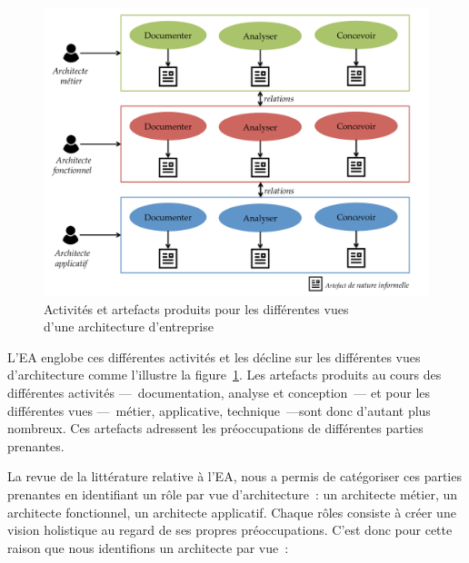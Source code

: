 \begin{figure}[!ht]
     \begin{center}
    \includegraphics[width=1\textwidth]{figures/4_demarche/pratique_courante_ea.pdf}
     \end{center}
     \caption{Activités et artefacts produits pour les différentes vues \\
              d'une architecture d'entreprise}
     \label{fig:limites_ea}
\end{figure}

L'EA englobe ces différentes activités et les décline sur les différentes
vues d'architecture comme l'illustre la
figure~\ref{fig:limites_ea}. Les artefacts produits au cours des différentes
activités —~documentation, analyse et conception~— et pour les différentes vues —~métier,
applicative, technique~—sont donc d'autant plus nombreux. Ces artefacts
adressent les préoccupations de différentes parties prenantes.

La revue de la littérature relative à l'EA, nous a permis de catégoriser ces
parties prenantes en identifiant un rôle par vue d'architecture~: un architecte
métier, un architecte fonctionnel, un architecte applicatif. Chaque
rôles consiste à créer une vision holistique au regard de ses
propres préoccupations. C'est donc pour cette raison que nous identifions un
architecte par vue~:

